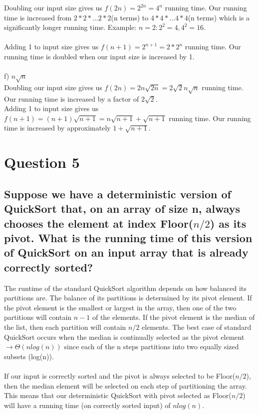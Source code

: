 \documentclass[11pt]{article}
\begin{document}
Doubling our input size gives us $ f(2n)=2^{2n}=4^n $ running time. Our running time is increased from $2*2*...2*2 $(n terms) to $4*4*...4*4 $(n terms) which is a significantly longer running time. Example: $n=2: 2^2 = 4,  4^2 = 16$.\\\\
Adding 1 to input size gives us $ f(n+1)=2^{n+1}=2*2^n $ running time. Our running time is doubled when our input size is increased by 1.\\\\
f) $ n \sqrt n $\\
Doubling our input size gives us $ f(2n)=2n \sqrt {2n} = 2 \sqrt 2 n \sqrt n$ running time. Our running time is increased by a factor of $2 \sqrt 2$.\\
Adding 1 to input size gives us $ f(n+1)=(n+1) \sqrt {n+1} = n \sqrt {n+1} + \sqrt {n+1} $ running time. Our running time is increased by approximately $1 + \sqrt {n+1}$.\\

\section{Question 5}
\subsection{Suppose we have a deterministic version of QuickSort that, on an array of size n, always chooses the element at index Floor($ n/2 $) as its pivot. What is the running time of this version of QuickSort on an input array that is already correctly sorted?}

The runtime of the standard QuickSort algorithm depends on how balanced its partitions are. The balance of its partitions is determined by its pivot element. If the pivot element is the smallest or largest in the array, then one of the two partitions will contain $n-1$ of the elements. If the pivot element is the median of the list, then each partition will contain $n/2$ elements. The best case of standard QuickSort occurs when the median is continually selected as the pivot element $\rightarrow \Theta (nlog(n)) $ since each of the n steps partitions into two equally sized subsets (log(n)).\\\\If our input is correctly sorted and the pivot is always selected to be Floor($n/2$), then the median element will be selected on each step of partitioning the array. This means that our deterministic QuickSort with pivot selected as Floor($n/2$) will have a running time (on correctly sorted input) of $nlog(n)$.
\end{document}
